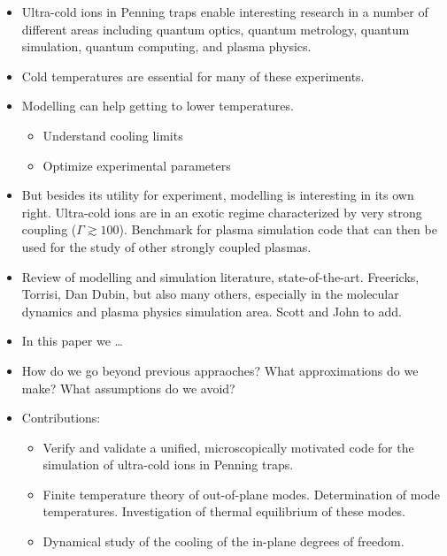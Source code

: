 \documentclass[aps, pra, preprint]{revtex4-1}
\begin{document}
\begin{itemize}
    \item Ultra-cold ions in Penning traps enable interesting
        research in a number of different areas including
        quantum optics, quantum metrology, quantum
        simulation, quantum computing, and plasma physics.
    \item Cold temperatures are essential for many of these
        experiments.
    \item Modelling can help getting to lower temperatures.
        \begin{itemize}
            \item Understand cooling limits
            \item Optimize experimental parameters
        \end{itemize}
    \item But besides its utility for experiment, modelling is
        interesting in its own right. Ultra-cold ions are in an
        exotic regime characterized by very strong coupling
        ($\Gamma \gtrsim 100$). Benchmark for plasma simulation
        code that can then be used for the study of other
        strongly coupled plasmas.
    \item Review of modelling and simulation literature,
        state-of-the-art. Freericks, Torrisi, Dan Dubin, but also
        many others, especially in the molecular dynamics and
        plasma physics simulation area. Scott and John to add.
    \item In this paper we \ldots
    \item How do we go beyond previous appraoches? What
        approximations do we make? What assumptions do we avoid?
    \item Contributions:
        \begin{itemize}
            \item Verify and validate a unified, microscopically
                motivated code for the simulation of ultra-cold
                ions in Penning traps.
            \item Finite temperature theory of out-of-plane
                modes. Determination of mode temperatures.
                Investigation of thermal equilibrium of these
                modes.
            \item Dynamical study of the cooling of the in-plane
                degrees of freedom.
        \end{itemize}
\end{itemize}
\end{document}
